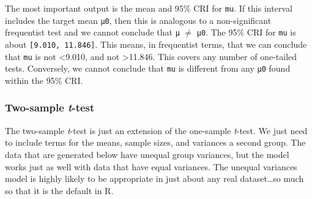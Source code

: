 \documentclass[
  13,
  letterpaper,
]{report}
\begin{document}
The most important output is the mean and 95\% CRI for \texttt{mu}. If
this interval includes the target mean \texttt{μ0}, then this is
analogous to a non-significant frequentist test and we cannot conclude
that \texttt{μ} \(\neq\) \texttt{μ0}. The 95\% CRI for \texttt{mu} is
about \texttt{{[}9.010,\ 11.846{]}}. This means, in frequentist terms,
that we can conclude that \texttt{mu} is not \textless9.010, and not
\textgreater11.846. This covers any number of one-tailed tests.
Conversely, we cannot conclude that \texttt{mu} is different from any
\texttt{μ0} found within the 95\% CRI.

\subsubsection{\texorpdfstring{Two-sample
\emph{t}-test}{Two-sample t-test}}\label{two-sample-t-test}

The two-sample \emph{t}-test is just an extension of the one-sample
\emph{t}-test. We just need to include terms for the means, sample
sizes, and variances a second group. The data that are generated below
have unequal group variances, but the model works just as well with data
that have equal variances. The unequal variances model is highly likely
to be appropriate in just about any real dataset\ldots so much so that
it is the default in R.
\end{document}

